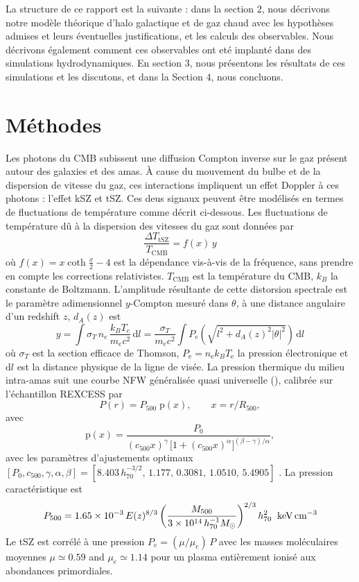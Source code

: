 \documentclass[a4paper, french, twoside, twocolumn, 11 pt]{article}
\newcommand{\deriv}{\mathrm{d}}
\begin{document}
La structure de ce rapport est la suivante : dans la section 2, nous décrivons notre modèle théorique d'halo galactique et de gaz chaud avec les hypothèses admises et leurs éventuelles justifications, et les calculs des observables. Nous décrivons également comment ces observables ont eté implanté dans des simulations hydrodynamiques. En section 3, nous présentons les résultats de ces simulations et les discutons, et dans la Section 4, nous concluons.
\section{Méthodes}
Les photons du CMB subissent une diffusion Compton inverse sur le gaz présent autour des galaxies et des amas. À cause du mouvement du bulbe et de la dispersion de vitesse du gaz, ces interactions impliquent un effet Doppler à ces photons : l'effet kSZ et tSZ.
Ces deus signaux peuvent être modélisés en termes de fluctuations de température comme décrit ci-dessous.
Les fluctuations de température dû à la dispersion des vitesses du gaz sont données par
\begin{equation}
\frac{\Delta T_\text{tSZ}}{T_\text{CMB}}=f(x)\, y
\end{equation}
où $f(x) = x\coth\!\frac{x}{2}-4$ est la dépendance vis-à-vis de la fréquence, sans prendre en compte les corrections relativistes. $T_\text{CMB}$ est la température du CMB, $k_B$ la constante de Boltzmann.
L'amplitude résultante de cette distorsion spectrale est le paramètre adimensionnel $y$-Compton \cite{Sunyaev_1972} mesuré dans $\theta$, à une distance angulaire d'un redshift $z$, $d_A(z)$ est
\begin{equation}
y = \int \sigma_T\, n_e\, \frac{k_B T_e}{m_e c^2}\, \deriv l = \frac{\sigma_T}{m_e c^2}\int P_e(\sqrt{l^2+d_A(z)^2|\theta|^2})\, \deriv l
\end{equation}
où $\sigma_T$ est la section efficace de Thomson, $P_\text{e}=n_\text{e}k_BT_\text{e}$ la pression électronique et $\deriv l$ est la distance physique de la ligne de visée.
La pression thermique du milieu intra-amas suit une courbe NFW généralisée quasi universelle (\cite{Nagai_2007}), calibrée sur l'échantillon REXCESS par \cite{Arnaud_2010}
\begin{equation}
P(r) = P_{500}\; \text{p}(x), \qquad x = r/R_{500},
\end{equation}
avec
\begin{equation}
\text{p}(x) = \frac{P_0}{(c_{500}x)^{\gamma}\,\big[1+(c_{500}x)^{\alpha}\big]^{(\beta-\gamma)/\alpha}},
\end{equation}
avec les paramètres d'ajustements optimaux $[P_0,c_{500},\gamma,\alpha,\beta] = [8.403\,h_{70}^{-3/2},\,1.177,\,0.3081,\,1.0510,\,5.4905]$ \cite{Arnaud_2010}. La pression caractéristique est
\begin{equation}
P_{500} = 1.65\times10^{-3}\,E(z)^{8/3}
\left(\frac{M_{500}}{3\times10^{14}\,h_{70}^{-1}M_\odot}\right)^{2/3} h_{70}^{2}\;\;{\rm keV\,cm^{-3}}
\end{equation}
Le tSZ est corrélé à une pression $P_e = (\mu/\mu_e)\,P$ avec les masses moléculaires moyennes $\mu\simeq0.59$ and $\mu_e\simeq1.14$ pour un plasma entièrement ionisé aux abondances primordiales.
\end{document}
